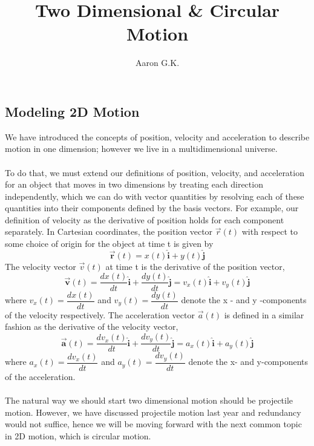 \documentclass[12pt,addpoints]{exam}
\title{Two Dimensional \& Circular Motion}
\author{Aaron G.K.}
\begin{document}
	\maketitle
	\begin{center}
		\subsection*{Modeling 2D Motion}
	\end{center}
	We have introduced the concepts of position, velocity and acceleration to describe motion in one dimension; however we live in a multidimensional universe. \\ \\
	To do that, we must extend our definitions of position, velocity, and acceleration for an object that moves in two dimensions by treating each direction independently, which we can do with vector quantities by resolving each of these quantities into their components defined by the basis vectors. For example, our definition of velocity as the derivative of position holds for each component separately. In Cartesian coordinates, the position vector $\vec r(t)$ with respect to some choice of origin for the object at time t is given by
	$$\overrightarrow{\mathbf{r}}(t)=x(t) \hat{\mathbf{i}}+y(t) \hat{\mathbf{j}}$$
	The velocity vector $\vec v(t)$ at time t is the derivative of the position vector, 
	$$\overrightarrow{\mathbf{v}}(t)=\frac{d x(t)}{d t} \hat{\mathbf{i}}+\frac{d y(t)}{d t} \hat{\mathbf{j}} = v_{x}(t) \hat{\mathbf{i}}+v_{y}(t) \hat{\mathbf{j}} \nonumber$$
	where $v_{x}(t) =\dfrac{dx(t)}{dt}$ and $v_{y}(t) = \dfrac{dy(t)}{dt}$ denote the x - and y -components of the velocity respectively.
	The acceleration vector $\vec a(t)$ is defined in a similar fashion as the derivative of the velocity vector,
	$$\overrightarrow{\mathbf{a}}(t)=\frac{d v_{x}(t)}{d t} \hat{\mathbf{i}}+\frac{d v_{y}(t)}{d t} \hat{\mathbf{j}} = a_{x}(t) \hat{\mathbf{i}}+a_{y}(t) \hat{\mathbf{j}}$$
	where $a_x(t)=\dfrac{dv_x(t)}{dt}$ and $a_y(t)=\dfrac{dv_y(t)}{dt}$ denote the x- and y-components of the acceleration. \\ \\
	The natural way we should start two dimensional motion should be projectile motion. However, we have discussed projectile motion last year and redundancy would not suffice, hence we will be moving forward with the next common topic in 2D motion, which is circular motion.
\end{document}
